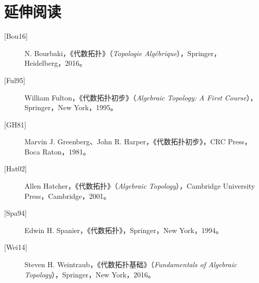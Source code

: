 \chapter*{延伸阅读}
\begin{description}
\item[{[Bou16]}] N. Bourbaki，《代数拓扑》（\textit{Topologie Algébrique}），Springer，Heidelberg，2016。
\item[{[Ful95]}] William Fulton，《代数拓扑初步》（\textit{Algebraic Topology: A First Course}），Springer，New York，1995。
\item[{[GH81]}] Marvin J. Greenberg、John R. Harper，《代数拓扑初步》，CRC Press，Boca Raton，1981。
\item[{[Hat02]}] Allen Hatcher，《代数拓扑》（\textit{Algebraic Topology}），Cambridge University Press，Cambridge，2001。
\item[{[Spa94]}] Edwin H. Spanier，《代数拓扑》，Springer，New York，1994。
\item[{[Wei14]}] Steven H. Weintraub，《代数拓扑基础》（\textit{Fundamentals of Algebraic Topology}），Springer，New York，2016。
\end{description}
